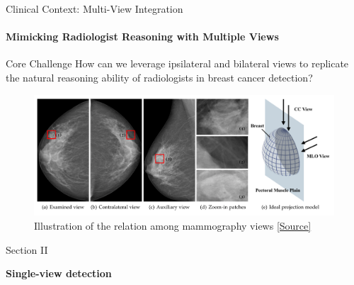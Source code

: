 \documentclass[8pt,aspectratio=169,xcolor=dvipsnames]{beamer}
\begin{document}
\begin{frame}{Clinical Context: Multi-View Integration}
    \framesubtitle{Mimicking Radiologist Reasoning with Multiple Views}
    
    \begin{alertblock}{Core Challenge}
How can we leverage ipsilateral and bilateral views to replicate the natural reasoning ability of radiologists in breast cancer detection?
    \end{alertblock}
\begin{figure}
    \centering
    \includegraphics[width=0.8\linewidth]{views.png}
    \caption{Illustration of the relation among mammography views \href{https://arxiv.org/abs/2105.10160}{[Source]}}
    \label{fig:enter-label}
\end{figure}
\end{frame}





{
\begin{frame}[plain]

    \vfill
    \begin{center}
    {\color{white}\large Section II}

    \vspace{1cm}

    {\color{white}\bfseries\fontsize{28}{34}\selectfont Single-view detection}
    \end{center}
    \vfill

\end{frame}
}
\end{document}
